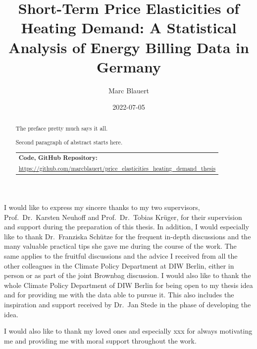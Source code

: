 \documentclass[12pt,twoside]{reedthesis}
\title{Short-Term Price Elasticities of Heating Demand: A Statistical Analysis of Energy Billing Data in Germany}
\author{Marc Blauert}
\date{2022-07-05}
\begin{document}
  \maketitle

\frontmatter %
\pagestyle{empty} %
  \begin{acknowledgements}
    I would like to express my sincere thanks to my two supervisors, Prof.~Dr.~Karsten Neuhoff and Prof.~Dr.~Tobias Krüger, for their supervision and support during the preparation of this thesis. In addition, I would especially like to thank Dr.~Franziska Schütze for the frequent in-depth discussions and the many valuable practical tips she gave me during the course of the work. The same applies to the fruitful discussions and the advice I received from all the other colleagues in the Climate Policy Department at DIW Berlin, either in person or as part of the joint Brownbag discussion. I would also like to thank the whole Climate Policy Department of DIW Berlin for being open to my thesis idea and for providing me with the data able to pursue it. This also includes the inspiration and support received by Dr.~Jan Stede in the phase of developing the idea.

    \par
    \bigskip

    I would also like to thank my loved ones and especially xxx for always motivating me and providing me with moral support throughout the work.
  \end{acknowledgements}

  \hypersetup{linkcolor=black}
  \setcounter{secnumdepth}{2}
  \setcounter{tocdepth}{2}
  \tableofcontents

  \listoftables

  \listoffigures
  \begin{abstract}
    The preface pretty much says it all.

    \par

    Second paragraph of abstract starts here.

    \bigskip \bigskip \noindent
    \begin{tabular}{m{14cm}} \hline \textbf{Code, GitHub Repository:}                                                            \\ \footnotesize \url{https://github.com/marcblauert/price_elasticities_heating_demand_thesis}    \\ \hline \end{tabular}
  \end{abstract}
\end{document}
